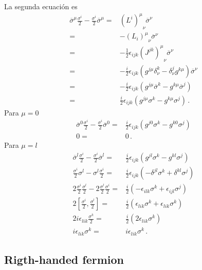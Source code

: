 \begin{frame}
La segunda ecuación es
\begin{align*}
\overline{\sigma}^{\mu} \frac{{\sigma^i}}{2}-\frac{{\sigma^i}}{2}\overline{\sigma}^{\mu}=&{\left(L^i  \right)^{\mu}}_{\nu}\overline{\sigma}^\nu \nonumber\\
 =&-{\left(L_i  \right)^{\mu}}_{\nu}\overline{\sigma}^\nu \nonumber\\
=&-\tfrac{1}{2}\epsilon_{ijk}{\left(J^{jk}  \right)^{\mu}}_{\nu}\overline{\sigma}^\nu \nonumber\\
 =&-\tfrac{i}{2}\epsilon_{ijk}\left(g^{j\mu}\delta^{k}_{\nu}-\delta^{j}_{\nu}g^{k\mu}  \right)\overline{\sigma}^\nu \nonumber\\
 =&-\tfrac{i}{2}\epsilon_{ijk}\left(g^{j\mu}\overline{\sigma}^k-g^{k\mu}\overline{\sigma}^j  \right) \nonumber\\
 =&\tfrac{i}{2}\epsilon_{ijk}\left(g^{j\mu}{\sigma}^k-g^{k\mu}{\sigma}^j  \right)\,.
\end{align*}
Para $\mu=0$
\begin{align*}
  \overline{\sigma}^{0} \frac{{\sigma^i}}{2}-\frac{{\sigma^i}}{2}\overline{\sigma}^{0}=& \frac{i}{2}\epsilon_{ijk}\left(g^{j0}{\sigma}^k-g^{k0}{\sigma}^j  \right)\nonumber\\
0=&0 \,.
\end{align*}
Para $\mu=l$
\begin{align*}
  \overline{\sigma}^l \frac{{\sigma^i}}{2}-\frac{{\sigma^i}}{2}\overline{\sigma}^l=&\frac{i}{2}\epsilon_{ijk}\left(g^{jl}{\sigma}^k-g^{kl}{\sigma}^j  \right)\nonumber\\
   \frac{{\sigma^i}}{2}{\sigma}^l -{\sigma}^l \frac{{\sigma^i}}{2}=&\frac{i}{2}\epsilon_{ijk}\left(-\delta^{jl}{\sigma}^k+\delta^{kl}{\sigma}^j  \right)\nonumber\\
  2\frac{\sigma^i}{2}\frac{\sigma^l}{2} -2\frac{\sigma^l}{2}\frac{\sigma^i}{2}=&\frac{i}{2}\left(-\epsilon_{ilk}{\sigma}^k+\epsilon_{ijl}{\sigma}^j  \right)\nonumber\\
 2\left[ \frac{\sigma^i}{2},\frac{\sigma^l}{2} \right]=&\frac{i}{2}\left(\epsilon_{lik}{\sigma}^k+\epsilon_{lik}{\sigma}^k  \right)\nonumber\\
 2i\epsilon_{lik}\frac{\sigma^{k}}{2}=&\frac{i}{2}\left(2\epsilon_{lik}  \sigma^{k}\right)\nonumber\\
 i\epsilon_{lik}{\sigma^{k}}=&i\epsilon_{lik}  \sigma^{k}\,.
\end{align*}

\end{frame}


\subsection{Rigth-handed fermion}

